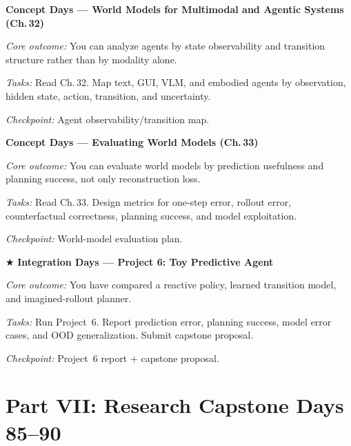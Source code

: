 \begin{description}[style=nextline, leftmargin=1.8cm, labelwidth=1.5cm]
\item[Day 80] \textbf{Concept Days --- World Models for Multimodal and Agentic Systems (Ch.\,32)}

\textit{Core outcome:} You can analyze agents by state observability and transition structure rather than by modality alone.

\textit{Tasks:} Read Ch.\,32. Map text, GUI, VLM, and embodied agents by observation, hidden state, action, transition, and uncertainty.

\textit{Checkpoint:} Agent observability/transition map.

\item[Day 81] \textbf{Concept Days --- Evaluating World Models (Ch.\,33)}

\textit{Core outcome:} You can evaluate world models by prediction usefulness and planning success, not only reconstruction loss.

\textit{Tasks:} Read Ch.\,33. Design metrics for one-step error, rollout error, counterfactual correctness, planning success, and model exploitation.

\textit{Checkpoint:} World-model evaluation plan.

\item[Day 82--84] $\bigstar$ \textbf{Integration Days --- Project 6: Toy Predictive Agent}

\textit{Core outcome:} You have compared a reactive policy, learned transition model, and imagined-rollout planner.

\textit{Tasks:} Run Project~6. Report prediction error, planning success, model error cases, and OOD generalization. Submit capstone proposal.

\textit{Checkpoint:} Project~6 report + capstone proposal.

\end{description}

\section*{Part VII: Research Capstone \hfill Days 85--90}

